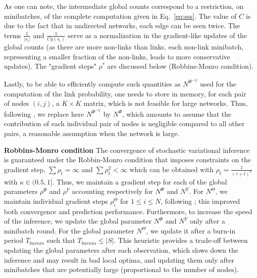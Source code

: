 %
As one can note, the intermediate global counts correspond to a restriction, on minibatches, of the complete computation given in Eq.~\ref{eq:sss}. The value of $C$ is due to the fact that in undirected networks, each edge can be seen twice. The terms $\frac{1}{|s_i|}$ and $\frac{1}{Cg(s_i)}$ serve as a normalization in the gradient-like updates of the global counts (as there are more non-links than links, each non-link minibatch, representing a smaller fraction of the non-links, leads to more conservative updates). The "gradient steps" $\rho^*$ are discussed below (Robbins-Monro condition).

Lastly, to be able to efficiently compute such quantities as $N^{\Phi^{-ij}}$ used for the computation of the link probability, one needs to store in memory, for each pair of nodes $(i,j)$, a $K \times K$ matrix, which is not feasible for large networks. Thus, following \cite{foulds2013stochastic}, we replace here $N^{\Phi^{-ij}}$ by $N^{\Phi}$, which amounts to assume that the contribution of each individual pair of nodes is negligible compared to all other pairs, a reasonable assumption when the network is large. %

\textbf{Robbins-Monro condition} The convergence of stochastic variational inference is guaranteed under the Robbin-Monro condition \cite{robbins1951stochastic} that imposes constraints on the gradient step, $\sum \rho_t = \infty$ and $\sum \rho_t^2 < \infty$ which can be obtained with $\rho_t = \frac{1}{(\tau +t)^\kappa}$ with $\kappa \in (0.5, 1]$. Thus, we maintain a gradient step for each of the global parameters $\rho^\Phi$ and $\rho^Y$ accounting respectively for  $N^\Phi$ and $N^Y$. For $N^\Theta$, we maintain individual gradient steps $\rho_i^{\Theta}$ for $1\leq i\leq N$, following \cite{miller2009nonparametric}; this improved both convergence and prediction performance. Furthermore, to increase the speed of the inference, we update the global parameter $N^\Phi$ and $N^Y$ only after a minibatch round. For the global parameter $N^\Theta$, we update it after a burn-in period $T_{burnin}$ such that $T_{burnin} \leq |S|$.
This heuristic provides a trade-off between updating the global parameters after each observation, which slows down the inference and may result in bad local optima, and updating them only after minibatches that are potentially large (proportional to the number of nodes).

